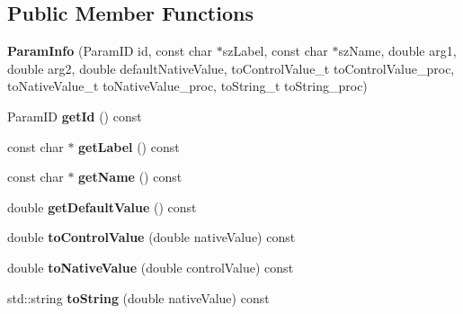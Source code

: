 \subsection*{Public Member Functions}
\begin{DoxyCompactItemize}
\item 
\hypertarget{classDsp_1_1ParamInfo_ad7ff3963d5b5704319e3fa8e994084d5}{{\bfseries Param\-Info} (Param\-I\-D id, const char $\ast$sz\-Label, const char $\ast$sz\-Name, double arg1, double arg2, double default\-Native\-Value, to\-Control\-Value\-\_\-t to\-Control\-Value\-\_\-proc, to\-Native\-Value\-\_\-t to\-Native\-Value\-\_\-proc, to\-String\-\_\-t to\-String\-\_\-proc)}\label{classDsp_1_1ParamInfo_ad7ff3963d5b5704319e3fa8e994084d5}

\item 
\hypertarget{classDsp_1_1ParamInfo_a15fe177fadc6dae7fd462ddc26392438}{Param\-I\-D {\bfseries get\-Id} () const }\label{classDsp_1_1ParamInfo_a15fe177fadc6dae7fd462ddc26392438}

\item 
\hypertarget{classDsp_1_1ParamInfo_ac030672041b9f8a3fdea4f2a8fa5a2b1}{const char $\ast$ {\bfseries get\-Label} () const }\label{classDsp_1_1ParamInfo_ac030672041b9f8a3fdea4f2a8fa5a2b1}

\item 
\hypertarget{classDsp_1_1ParamInfo_a21ed7591e423e56fdcf2469975bfc785}{const char $\ast$ {\bfseries get\-Name} () const }\label{classDsp_1_1ParamInfo_a21ed7591e423e56fdcf2469975bfc785}

\item 
\hypertarget{classDsp_1_1ParamInfo_a90c137bfc25bffc065405d1ce9a42cea}{double {\bfseries get\-Default\-Value} () const }\label{classDsp_1_1ParamInfo_a90c137bfc25bffc065405d1ce9a42cea}

\item 
\hypertarget{classDsp_1_1ParamInfo_a058eaf3a352ed931fb71f0a62e923d12}{double {\bfseries to\-Control\-Value} (double native\-Value) const }\label{classDsp_1_1ParamInfo_a058eaf3a352ed931fb71f0a62e923d12}

\item 
\hypertarget{classDsp_1_1ParamInfo_a60ebabb3867b8f6af22a1b184bee2070}{double {\bfseries to\-Native\-Value} (double control\-Value) const }\label{classDsp_1_1ParamInfo_a60ebabb3867b8f6af22a1b184bee2070}

\item 
\hypertarget{classDsp_1_1ParamInfo_a9999624b99355d32b343417ada5e8a76}{std\-::string {\bfseries to\-String} (double native\-Value) const }\label{classDsp_1_1ParamInfo_a9999624b99355d32b343417ada5e8a76}


\end{DoxyCompactItemize}
